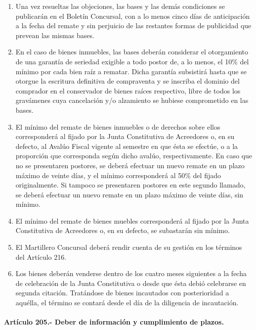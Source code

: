 \documentclass[
]{book}
\begin{document}
\begin{enumerate}
\def\labelenumi{\alph{enumi})}
\setcounter{enumi}{2}
\item
  Una vez resueltas las objeciones, las bases y las demás condiciones se publicarán en el Boletín Concursal, con a lo menos cinco días de anticipación a la fecha del remate y sin perjuicio de las restantes formas de publicidad que prevean las mismas bases.
\item
  En el caso de bienes inmuebles, las bases deberán considerar el otorgamiento de una garantía de seriedad exigible a todo postor de, a lo menos, el 10\% del mínimo por cada bien raíz a rematar. Dicha garantía subsistirá hasta que se otorgue la escritura definitiva de compraventa y se inscriba el dominio del comprador en el conservador de bienes raíces respectivo, libre de todos los gravámenes cuya cancelación y/o alzamiento se hubiese comprometido en las bases.
\item
  El mínimo del remate de bienes inmuebles o de derechos sobre ellos corresponderá al fijado por la Junta Constitutiva de Acreedores o, en su defecto, al Avalúo Fiscal vigente al semestre en que ésta se efectúe, o a la proporción que corresponda según dicho avalúo, respectivamente. En caso que no se presentaren postores, se deberá efectuar un nuevo remate en un plazo máximo de veinte días, y el mínimo corresponderá al 50\% del fijado originalmente. Si tampoco se presentaren postores en este segundo llamado, se deberá efectuar un nuevo remate en un plazo máximo de veinte días, sin mínimo.
\item
  El mínimo del remate de bienes muebles corresponderá al fijado por la Junta Constitutiva de Acreedores o, en su defecto, se subastarán sin mínimo.
\item
  El Martillero Concursal deberá rendir cuenta de su gestión en los términos del Artículo 216.
\item
  Los bienes deberán venderse dentro de los cuatro meses siguientes a la fecha de celebración de la Junta Constitutiva o desde que ésta debió celebrarse en segunda citación. Tratándose de bienes incautados con posterioridad a aquélla, el término se contará desde el día de la diligencia de incautación.
\end{enumerate}

\hypertarget{artuxedculo-205.--deber-de-informaciuxf3n-y-cumplimiento-de-plazos.}{%
\paragraph*{Artículo 205.- Deber de información y cumplimiento de plazos.}\label{artuxedculo-205.--deber-de-informaciuxf3n-y-cumplimiento-de-plazos.}}
\end{document}
